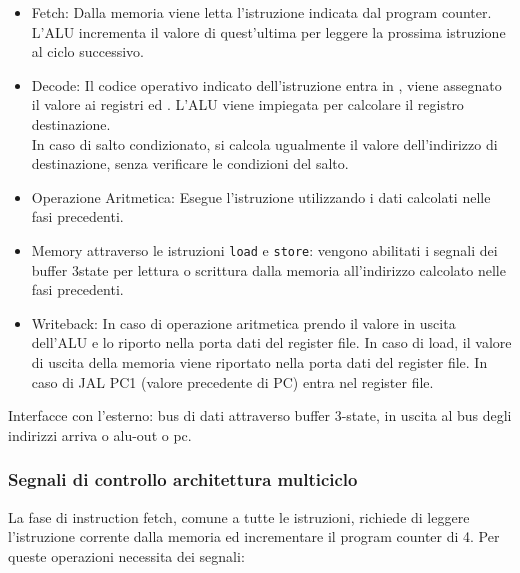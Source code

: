 \documentclass[../ace.tex]{subfiles}
\begin{document}
\begin{itemize}
    \item Fetch:
        Dalla memoria viene letta l'istruzione indicata dal program counter. L'ALU incrementa il valore di quest'ultima per leggere la prossima istruzione al ciclo successivo.
    \item Decode:
        Il codice operativo indicato dell'istruzione entra in , viene assegnato il valore ai registri  ed . L'ALU viene impiegata per calcolare il registro destinazione.
        \\
        In caso di salto condizionato, si calcola ugualmente il valore dell'indirizzo di destinazione, senza verificare le condizioni del salto.
    \item Operazione Aritmetica:
        Esegue l'istruzione utilizzando i dati calcolati nelle fasi precedenti.
    \item Memory attraverso le istruzioni \lstinline{load} e \lstinline{store}: vengono abilitati i segnali dei buffer 3state per lettura o scrittura dalla memoria all'indirizzo  calcolato nelle fasi precedenti.
    \item Writeback:
        In caso di operazione aritmetica prendo il valore in uscita dell'ALU e lo riporto nella porta dati del register file.
        In caso di load, il valore di uscita della memoria viene riportato nella porta dati del register file.
        In caso di JAL PC1 (valore precedente di PC) entra nel register file.
\end{itemize}

Interfacce con l'esterno: bus di dati attraverso buffer 3-state, in uscita al bus degli indirizzi arriva o alu-out o pc.



\subsubsection{Segnali di controllo architettura multiciclo}
La fase di instruction fetch, comune a tutte le istruzioni, richiede di leggere l'istruzione corrente dalla memoria ed
incrementare il program counter di 4. Per queste operazioni necessita dei segnali:
\end{document}
